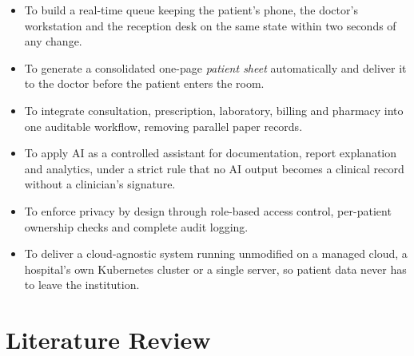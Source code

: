 \documentclass[12pt,a4paper]{article}
\begin{document}
\begin{itemize}
  \item To build a real-time queue keeping the patient's phone, the doctor's workstation and the reception desk on the same state within two seconds of any change.
  \item To generate a consolidated one-page \emph{patient sheet} automatically and deliver it to the doctor before the patient enters the room.
  \item To integrate consultation, prescription, laboratory, billing and pharmacy into one auditable workflow, removing parallel paper records.
  \item To apply AI as a controlled assistant for documentation, report explanation and analytics, under a strict rule that no AI output becomes a clinical record without a clinician's signature.
  \item To enforce privacy by design through role-based access control, per-patient ownership checks and complete audit logging.
  \item To deliver a cloud-agnostic system running unmodified on a managed cloud, a hospital's own Kubernetes cluster or a single server, so patient data never has to leave the institution.
\end{itemize}

\clearpage
\section{Literature Review}
\end{document}
